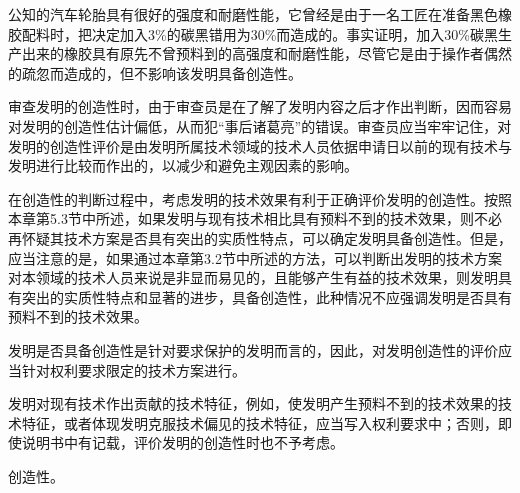 {\par}

公知的汽车轮胎具有很好的强度和耐磨性能，它曾经是由于一名工匠在准备黑色橡胶配料时，把决定加入3\%的碳黑错用为30\%而造成的。事实证明，加入30\%碳黑生产出来的橡胶具有原先不曾预料到的高强度和耐磨性能，尽管它是由于操作者偶然的疏忽而造成的，但不影响该发明具备创造性。

审查发明的创造性时，由于审查员是在了解了发明内容之后才作出判断，因而容易对发明的创造性估计偏低，从而犯“事后诸葛亮”的错误。审查员应当牢牢记住，对发明的创造性评价是由发明所属技术领域的技术人员依据申请日以前的现有技术与发明进行比较而作出的，以减少和避免主观因素的影响。

在创造性的判断过程中，考虑发明的技术效果有利于正确评价发明的创造性。按照本章第5.3节中所述，如果发明与现有技术相比具有预料不到的技术效果，则不必再怀疑其技术方案是否具有突出的实质性特点，可以确定发明具备创造性。但是，应当注意的是，如果通过本章第3.2节中所述的方法，可以判断出发明的技术方案对本领域的技术人员来说是非显而易见的，且能够产生有益的技术效果，则发明具有突出的实质性特点和显著的进步，具备创造性，此种情况不应强调发明是否具有预料不到的技术效果。

发明是否具备创造性是针对要求保护的发明而言的，因此，对发明创造性的评价应当针对权利要求限定的技术方案进行。

发明对现有技术作出贡献的技术特征，例如，使发明产生预料不到的技术效果的技术特征，或者体现发明克服技术偏见的技术特征，应当写入权利要求中；否则，即使说明书中有记载，评价发明的创造性时也不予考虑。


创造性。

